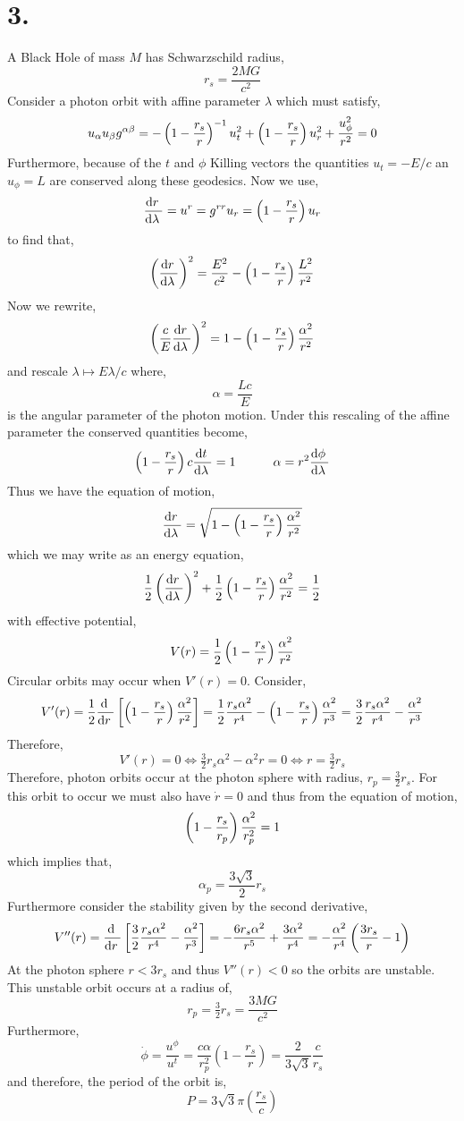 \documentclass[12pt]{article}
\begin{document}
\section*{3.}
A Black Hole of mass $M$ has Schwarzschild radius,
\[ r_s = \frac{2MG}{c^2} \]
Consider a photon orbit with affine parameter $\lambda$ which must satisfy,
\[ u_\alpha u_\beta g^{\alpha \beta} = - \left( 1 - \frac{r_s}{r} \right)^{-1} u_{t}^2 + \left( 1 - \frac{r_s}{r} \right) u_r^2 + \frac{u_\phi^2}{r^2} = 0 \] 
Furthermore, because of the $t$ and $\phi$ Killing vectors the quantities $u_t = -E/c$ an $u_\phi = L$ are conserved along these geodesics. 
Now we use,
\[ \frac{\mathrm{d}r \:}{\mathrm{d}\lambda \:} = u^r = g^{rr} u_r = \left( 1 - \frac{r_s}{r} \right) u_r \]
to find that,
\[ \left( \frac{\mathrm{d}r \:}{\mathrm{d}\lambda \:} \right)^2 = \frac{E^2}{c^2} - \left( 1 - \frac{r_s}{r} \right) \frac{L^2}{r^2} \]
Now we rewrite,
\[ \left( \frac{c}{E} \frac{\mathrm{d}r \:}{\mathrm{d}\lambda \:} \right)^2 = 1 - \left( 1 - \frac{r_s}{r} \right) \frac{\alpha^2}{r^2} \]
and rescale $\lambda \mapsto E \lambda/c$ where,
\[ \alpha = \frac{Lc}{E} \]
is the angular parameter of the photon motion. Under this rescaling of the affine parameter the conserved quantities become,
\[ \left( 1 - \frac{r_s}{r} \right) c \frac{\mathrm{d}t \:}{\mathrm{d}\lambda \:} = 1 \quad \quad \quad \alpha = r^2 \frac{\mathrm{d}\phi \:}{\mathrm{d}\lambda \:} \]
Thus we have the equation of motion,
\[ \frac{\mathrm{d}r \:}{\mathrm{d}\lambda \:} = \sqrt{1 - \left( 1 - \frac{r_s}{r} \right) \frac{\alpha^2}{r^2}} \]
which we may write as an energy equation,
\[ \frac{1}{2} \left( \frac{\mathrm{d}r \:}{\mathrm{d}\lambda \:} \right)^2 + \frac{1}{2} \left( 1 - \frac{r_s}{r} \right) \frac{\alpha^2}{r^2} = \frac{1}{2} \]
with effective potential,
\[ V(r) = \frac{1}{2} \left( 1 - \frac{r_s}{r} \right) \frac{\alpha^2}{r^2} \]
Circular orbits may occur when $V'(r) = 0$. Consider,
\begin{align*}
V'(r) = \frac{1}{2} \frac{\mathrm{d} \:}{\mathrm{d}r \:} \left[ \left( 1 - \frac{r_s}{r} \right) \frac{\alpha^2}{r^2} \right] = \frac{1}{2} \frac{r_s \alpha^2}{r^4} - \left( 1 - \frac{r_s}{r} \right) \frac{\alpha^2}{r^3} = \frac{3}{2} \frac{r_s \alpha^2}{r^4} - \frac{\alpha^2}{r^3}
\end{align*}
Therefore,
\[ V'(r) = 0 \iff \tfrac{3}{2} r_s \alpha^2 - \alpha^2 r = 0 \iff r = \tfrac{3}{2} r_s \]
Therefore, photon orbits occur at the photon sphere with radius, $r_p = \tfrac{3}{2} r_s$. For this orbit to occur we must also have $\dot{r} = 0$ and thus from the equation of motion,
\[ \left( 1 - \frac{r_s}{r_p} \right) \frac{\alpha^2}{r_p^2} = 1 \]
which implies that,
\[ \alpha_p = \frac{3 \sqrt{3}}{2} r_s \]
Furthermore consider the stability given by the second derivative,
\[ V''(r) = \frac{\mathrm{d} \:}{\mathrm{d}r \:} \left[ \frac{3}{2} \frac{r_s \alpha^2}{r^4} - \frac{\alpha^2}{r^3} \right] = - \frac{6 r_s \alpha^2}{r^5} + \frac{3 \alpha^2}{r^4} = - \frac{\alpha^2}{r^4} \left(\frac{3 r_s}{r} - 1 \right) \]
At the photon sphere $r < 3 r_s$ and thus $V''(r) < 0$ so the orbits are unstable. This unstable orbit occurs at a radius of,
\[ r_p = \tfrac{3}{2} r_s = \frac{3 MG}{c^2} \]
Furthermore,
\[ \dot{\phi} = \frac{u^\phi}{u^t} = \frac{c \alpha}{r_p^2} \left( 1 - \frac{r_s}{r} \right) = \frac{2}{3 \sqrt{3}} \frac{c}{r_s}  \]
and therefore, the period of the orbit is,
\[ P = 3 \sqrt{3} \pi \left( \frac{r_s}{c} \right) \]
\end{document}
